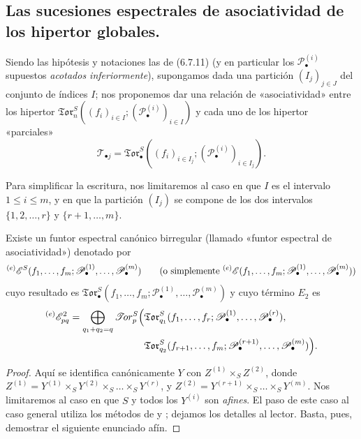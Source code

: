 \subsection{Las sucesiones espectrales de asociatividad de los hipertor globales.}

\begin{env}[6.8.1]
Siendo las hipótesis y notaciones las de (6.7.11) (y en particular los
$\mathscr P_\bullet^{(i)}$ supuestos \emph{acotados inferiormente}), supongamos
dada una partición $(I_j)_{j\in J}$ del conjunto de índices $I$; nos
proponemos dar una relación de «asociatividad» entre los hipertor
$\mathfrak{Tor}_n^S((f_i)_{i\in I};(\mathscr P_\bullet^{(i)})_{i\in I})$ y
cada uno de los hipertor «parciales»
\[
  \mathscr T_{\bullet j}
  =\mathfrak{Tor}_\bullet^S
  ((f_i)_{i\in I_j};(\mathscr P_\bullet^{(i)})_{i\in I_j}).
\]

Para simplificar la escritura, nos limitaremos al caso en que $I$ es
el intervalo $1\leq i\leq m$, y en que la partición $(I_j)$ se compone de los dos
intervalos $\{1,2,\ldots,r\}$ y $\{r+1,\ldots,m\}$.
\end{env}

\begin{proposition}[6.8.2]
Existe un funtor espectral canónico birregular \textup{(llamado «funtor espectral
de asociatividad»)} denotado por
\[
  {}^{(e)}\mathscr E^S
  (f_1,\ldots,f_m;
   \mathscr P_\bullet^{(1)},\ldots,\mathscr P_\bullet^{(m)})
  \qquad\textup{(o simplemente ${}^{(e)}\mathscr E(f_1,\ldots,f_m;
\mathscr P_\bullet^{(1)},\ldots,\mathscr P_\bullet^{(m)})$)}
\]
cuyo
resultado es
$\mathfrak{Tor}_\bullet^S(f_1,\ldots,f_m;
\mathscr P_\bullet^{(1)},\ldots,\mathscr P_\bullet^{(m)})$
y cuyo término $E_2$ es
\[
\begin{split}
  {}^{(e)}\mathscr E_{pq}^2
  =\bigoplus_{q_1+q_2=q}
  \mathscr{T}\!or_p^S\Bigl(
  &\mathfrak{Tor}_{q_1}^S
  (f_1,\ldots,f_r;
   \mathscr P_\bullet^{(1)},\ldots,\mathscr P_\bullet^{(r)}),\\
  &\mathfrak{Tor}_{q_2}^S
  (f_{r+1},\ldots,f_m;
   \mathscr P_\bullet^{(r+1)},\ldots,\mathscr P_\bullet^{(m)})
  \Bigr).
\end{split}
\]
\end{proposition}

\begin{proof}
Aquí se identifica canónicamente $Y$ con
$Z^{(1)}\times_S Z^{(2)}$, donde
$Z^{(1)}=Y^{(1)}\times_S Y^{(2)}\times_S\ldots\times_S Y^{(r)}$, y
$Z^{(2)}=Y^{(r+1)}\times_S\ldots\times_S Y^{(m)}$. Nos limitaremos al
caso en que $S$ y todos los $Y^{(i)}$ son \emph{afines}.
El paso de este caso al caso general utiliza los métodos de
 y ; dejamos los detalles al
lector. Basta, pues, demostrar el siguiente enunciado afín.
\end{proof}

